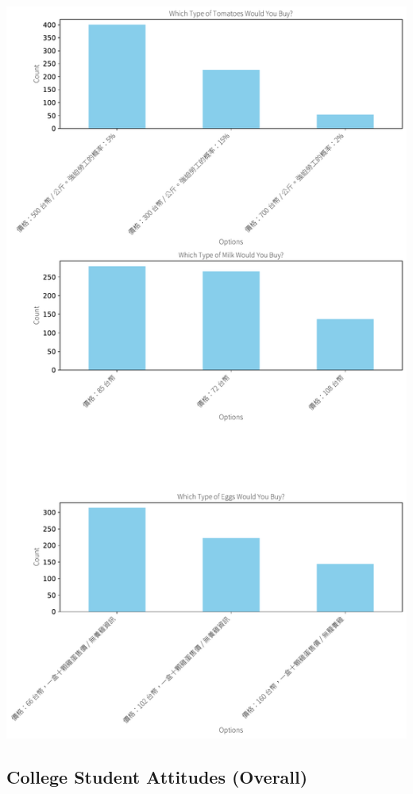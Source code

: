 \documentclass[
  letterpaper,
  DIV=11,
  numbers=noendperiod]{scrartcl}
\begin{document}
\includegraphics{_thesis_files/figure-pdf/cell-64-output-1.pdf}

\newpage

\subsection{College Student Attitudes
(Overall)}\label{college-student-attitudes-overall}
\end{document}
